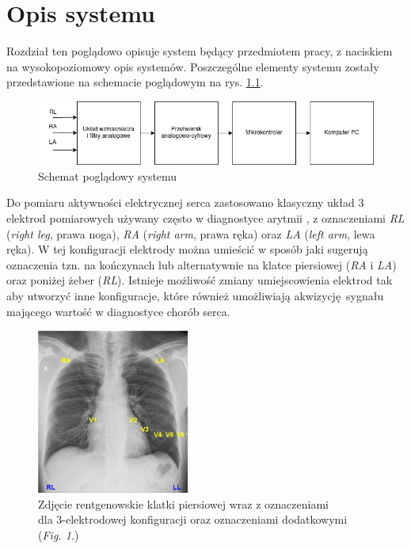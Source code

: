
\chapter{Opis systemu}

Rozdział ten poglądowo opisuje system będący przedmiotem pracy, z naciskiem na 
wysokopoziomowy opis systemów. 
Poszczególne elementy systemu zostały przedstawione na schemacie poglądowym na rys. \ref{fig:hl_sys}.

\begin{figure}[h!]
    \centering
    \includegraphics[scale=0.6]{pl/media/hl_system.png}
    \caption{Schemat poglądowy systemu}
    \label{fig:hl_sys}
\end{figure}

Do pomiaru aktywności elektrycznej serca zastosowano klasyczny układ 3 elektrod pomiarowych używany często
w diagnostyce arytmii \cite{FRANCIS201692}, z oznaczeniami \textit{RL} (\textit{right leg}, prawa noga), 
\textit{RA} (\textit{right arm}, prawa ręka) oraz \textit{LA} (\textit{left arm}, lewa ręka). W tej 
konfiguracji elektrody można umieścić w sposób jaki sugerują oznaczenia tzn. na kończynach lub alternatywnie 
na klatce piersiowej (\textit{RA} i \textit{LA}) oraz poniżej żeber (\textit{RL}). 
Istnieje możliwość zmiany umiejscowienia elektrod tak aby utworzyć inne konfiguracje, które również umożliwiają akwizycję sygnału
mającego wartość w diagnostyce chorób serca.

\begin{figure}[h!]
    \centering 
    \includegraphics[scale=1.2]{pl/media/electrodes.png}
    \caption{Zdjęcie rentgenowskie klatki piersiowej wraz z oznaczeniami\\ dla 3-elektrodowej konfiguracji oraz oznaczeniami dodatkowymi
    \cite{FRANCIS201692}(\textit{Fig. 1.})}
    \label{fig:ele}
\end{figure}

